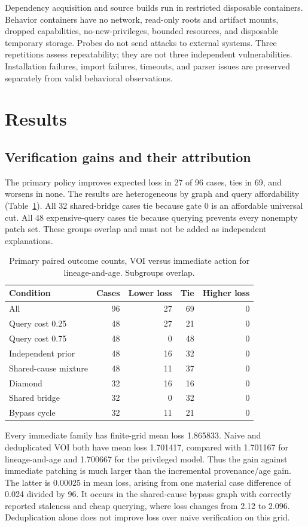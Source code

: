 \documentclass[manuscript,screen,nonacm]{acmart}
\begin{document}
Dependency acquisition and source builds run in restricted disposable containers. Behavior containers have no network, read-only roots and artifact mounts, dropped capabilities, no-new-privileges, bounded resources, and disposable temporary storage. Probes do not send attacks to external systems. Three repetitions assess repeatability; they are not three independent vulnerabilities. Installation failures, import failures, timeouts, and parser issues are preserved separately from valid behavioral observations.

\section{Results}\label{sec:results}
\subsection{Verification gains and their attribution}
The primary policy improves expected loss in 27 of 96 cases, ties in 69, and worsens in none. The results are heterogeneous by graph and query affordability (Table~\ref{tab:primary}). All 32 shared-bridge cases tie because gate 0 is an affordable universal cut. All 48 expensive-query cases tie because querying prevents every nonempty patch set. These groups overlap and must not be added as independent explanations.

\begin{table}[t]
\caption{Primary paired outcome counts, VOI versus immediate action for lineage-and-age. Subgroups overlap.}
\label{tab:primary}
\begin{tabular}{lrrrr}
\toprule Condition & Cases & Lower loss & Tie & Higher loss \\
\midrule
All &96&27&69&0\\
Query cost 0.25 &48&27&21&0\\
Query cost 0.75 &48&0&48&0\\
Independent prior &48&16&32&0\\
Shared-cause mixture &48&11&37&0\\
Diamond &32&16&16&0\\
Shared bridge &32&0&32&0\\
Bypass cycle &32&11&21&0\\
\bottomrule
\end{tabular}
\end{table}

Every immediate family has finite-grid mean loss 1.865833. Naive and deduplicated VOI both have mean loss 1.701417, compared with 1.701167 for lineage-and-age and 1.700667 for the privileged model. Thus the gain against immediate patching is much larger than the incremental provenance/age gain. The latter is 0.00025 in mean loss, arising from one material case difference of 0.024 divided by 96. It occurs in the shared-cause bypass graph with correctly reported staleness and cheap querying, where loss changes from 2.12 to 2.096. Deduplication alone does not improve loss over naive verification on this grid.
\end{document}
